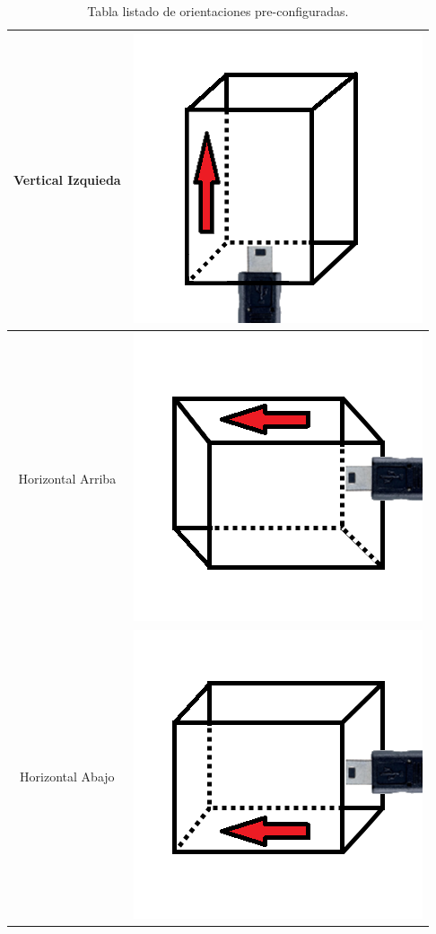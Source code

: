 \documentclass[12pt,a4paper]{article}
\begin{document}
\begin{table}[H]
\begin{tabular}{|c|c|}
		\hline 
		Vertical Izquieda & \includegraphics[scale=0.2]{images/IMU/verticalizquierda}   \\ 
		\hline 
		Horizontal Arriba &  \includegraphics[scale=0.2]{images/IMU/horizontalarriba}   \\ 
		\hline 
		Horizontal Abajo &  \includegraphics[scale=0.2]{images/IMU/horizontalabajo}   \\ 
		\hline 
	\end{tabular}
	\caption{Tabla listado de orientaciones pre-configuradas.}
	\label{table:listadoOrientaciones}
\end{table}
\end{document}
